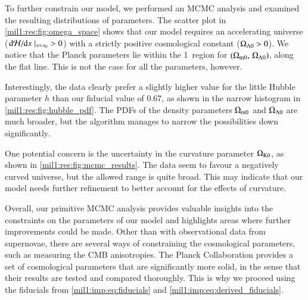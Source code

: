     To further constrain our model, we performed an MCMC analysis and examined the resulting distributions of parameters. The scatter plot in \cref{mil1:res:fig:omega_space} shows that our model requires an accelerating universe ($\dv*{\mathcal{H}}{x}|_{x=x_0} > 0$) with a strictly positive cosmological constant ($\Omega_{\mathrm{\Lambda}0}>0$). We notice that the Planck parameters lie within the 1\textsigma~region for $(\Omega_{\mathrm{m}0},\, \Omega_{\mathrm{\Lambda}0})$, along the flat line. This is not the case for all the parameters, however. 
    
    Interestingly, the data clearly prefer a slightly higher value for the little Hubble parameter $h$ than our fiducial value of 0.67, as shown in the narrow histogram in \cref{mil1:res:fig:hubble_pdf}. The PDFs of the density parameters $\Omega_{\mathrm{m}0}$ and $\Omega_{\mathrm{\Lambda}0}$ are much broader, but the algorithm manages to narrow the possibilities down significantly.

    One potential concern is the uncertainty in the curvature parameter $\Omega_{\mathrm{K}0}$, as shown in \cref{mil1:res:fig:mcmc_results}. The data seem to favour a negatively curved universe, but the allowed range is quite broad. This may indicate that our model needs further refinement to better account for the effects of curvature. 
    
    Overall, our primitive MCMC analysis provides valuable insights into the constraints on the parameters of our model and highlights areas where further improvements could be made. Other than with observational data from supernovae, there are several ways of constraining the cosmological parameters, such as measuring the CMB anisotropies. The Planck Collaboration \citep{Planckdata} provides a set of cosmological parameters that are significantly more solid, in the sense that their results are tested and compared thoroughly. This is why we proceed using the fiducials from \cref{mil1:imp:eq:fiducials} and \cref{mil1:imp:eq:derived_fiducials}.





